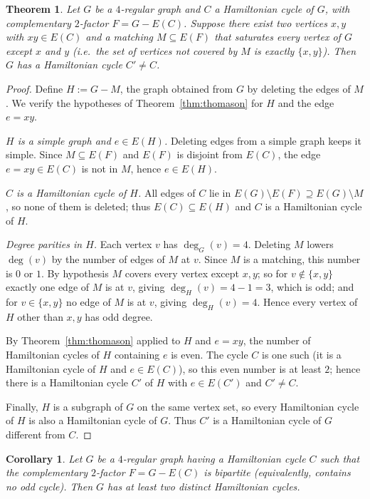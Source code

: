 \documentclass{amsart}
\theoremstyle{plain}
\newtheorem{theorem}{Theorem}
\newtheorem{corollary}{Corollary}
\theoremstyle{definition}
\begin{document}
\begin{theorem}\label{thm:main}
Let $G$ be a $4$-regular graph and $C$ a Hamiltonian cycle of $G$, with
complementary $2$-factor $F=G-E(C)$.  Suppose there exist two vertices $x,y$ with
$xy\in E(C)$ and a matching $M\subseteq E(F)$ that saturates every vertex of $G$
except $x$ and $y$ (i.e.\ the set of vertices not covered by $M$ is exactly
$\{x,y\}$).  Then $G$ has a Hamiltonian cycle $C'\neq C$.
\end{theorem}

\begin{proof}
Define $H:=G-M$, the graph obtained from $G$ by deleting the edges of $M$.
We verify the hypotheses of Theorem~\ref{thm:thomason} for $H$ and the edge
$e=xy$.

\emph{$H$ is a simple graph and $e\in E(H)$.}  Deleting edges from a simple graph
keeps it simple.  Since $M\subseteq E(F)$ and $E(F)$ is disjoint from $E(C)$, the
edge $e=xy\in E(C)$ is not in $M$, hence $e\in E(H)$.

\emph{$C$ is a Hamiltonian cycle of $H$.}  All edges of $C$ lie in $E(G)\setminus
E(F)\supseteq E(G)\setminus M$, so none of them is deleted; thus
$E(C)\subseteq E(H)$ and $C$ is a Hamiltonian cycle of $H$.

\emph{Degree parities in $H$.}  Each vertex $v$ has $\deg_G(v)=4$.  Deleting $M$
lowers $\deg(v)$ by the number of edges of $M$ at $v$.  Since $M$ is a matching,
this number is $0$ or $1$.  By hypothesis $M$ covers every vertex except $x,y$;
so for $v\notin\{x,y\}$ exactly one edge of $M$ is at $v$, giving
$\deg_H(v)=4-1=3$, which is odd; and for $v\in\{x,y\}$ no edge of $M$ is at $v$,
giving $\deg_H(v)=4$.  Hence every vertex of $H$ other than $x,y$ has odd degree.

By Theorem~\ref{thm:thomason} applied to $H$ and $e=xy$, the number of
Hamiltonian cycles of $H$ containing $e$ is even.  The cycle $C$ is one such
(it is a Hamiltonian cycle of $H$ and $e\in E(C)$), so this even number is at
least $2$; hence there is a Hamiltonian cycle $C'$ of $H$ with $e\in E(C')$ and
$C'\neq C$.

Finally, $H$ is a subgraph of $G$ on the same vertex set, so every Hamiltonian
cycle of $H$ is also a Hamiltonian cycle of $G$.  Thus $C'$ is a Hamiltonian
cycle of $G$ different from $C$.
\end{proof}

\begin{corollary}\label{cor:bipartite}
Let $G$ be a $4$-regular graph having a Hamiltonian cycle $C$ such that the
complementary $2$-factor $F=G-E(C)$ is bipartite (equivalently, contains no odd
cycle).  Then $G$ has at least two distinct Hamiltonian cycles.
\end{corollary}
\end{document}
